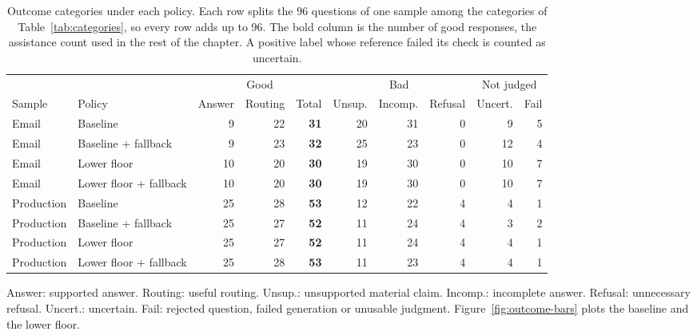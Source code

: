 \begin{table}[!htbp]
\centering\footnotesize
\setlength{\tabcolsep}{3pt}
\caption[Outcome categories under each policy]{Outcome categories under each policy. Each row splits the 96 questions of one sample among the categories of Table~\ref{tab:categories}, so every row adds up to 96. The bold column is the number of good responses, the assistance count used in the rest of the chapter. A positive label whose reference failed its check is counted as uncertain.}
\label{tab:luna-outcomes}
\begin{tabular}{@{}llrrrrrrrr@{}}
\toprule
 & & \multicolumn{3}{c}{Good} & \multicolumn{3}{c}{Bad} & \multicolumn{2}{c}{Not judged} \\
\cmidrule(lr){3-5}\cmidrule(lr){6-8}\cmidrule(l){9-10}
Sample & Policy & Answer & Routing & Total & Unsup. & Incomp. & Refusal & Uncert. & Fail \\
\midrule
Email & Baseline & 9 & 22 & \textbf{31} & 20 & 31 & 0 & 9 & 5 \\
Email & Baseline + fallback & 9 & 23 & \textbf{32} & 25 & 23 & 0 & 12 & 4 \\
Email & Lower floor & 10 & 20 & \textbf{30} & 19 & 30 & 0 & 10 & 7 \\
Email & Lower floor + fallback & 10 & 20 & \textbf{30} & 19 & 30 & 0 & 10 & 7 \\
\addlinespace
Production & Baseline & 25 & 28 & \textbf{53} & 12 & 22 & 4 & 4 & 1 \\
Production & Baseline + fallback & 25 & 27 & \textbf{52} & 11 & 24 & 4 & 3 & 2 \\
Production & Lower floor & 25 & 27 & \textbf{52} & 11 & 24 & 4 & 4 & 1 \\
Production & Lower floor + fallback & 25 & 28 & \textbf{53} & 11 & 23 & 4 & 4 & 1 \\
\bottomrule
\end{tabular}
\par\smallskip\begin{minipage}{0.94\textwidth}\footnotesize Answer: supported answer. Routing: useful routing. Unsup.: unsupported material claim. Incomp.: incomplete answer. Refusal: unnecessary refusal. Uncert.: uncertain. Fail: rejected question, failed generation or unusable judgment. Figure~\ref{fig:outcome-bars} plots the baseline and the lower floor.\end{minipage}
\end{table}
